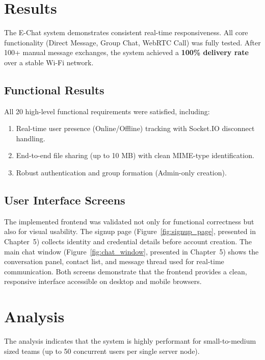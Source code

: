 \documentclass[12pt,a4paper,oneside]{report}
\begin{document}
\section{Results}
\label{sec:results}

The E-Chat system demonstrates consistent real-time responsiveness. All core
functionality (Direct Message, Group Chat, WebRTC Call) was fully tested. After
100+ manual message exchanges, the system achieved a \textbf{100\% delivery rate}
over a stable Wi-Fi network.

\subsection{Functional Results}
\label{subsec:functional-results}

All 20 high-level functional requirements were satisfied, including:
\begin{enumerate}
    \item Real-time user presence (Online/Offline) tracking with Socket.IO disconnect handling.
    \item End-to-end file sharing (up to 10 MB) with clean MIME-type identification.
    \item Robust authentication and group formation (Admin-only creation).
\end{enumerate}

\subsection{User Interface Screens}
\label{subsec:ui-screens}

The implemented frontend was validated not only for functional correctness but also
for visual usability. The signup page (Figure~\ref{fig:signup_page}, presented in
Chapter~5) collects identity and credential details before account creation.
The main chat window (Figure~\ref{fig:chat_window}, presented in Chapter~5)
shows the conversation panel, contact list, and message thread used for
real-time communication. Both screens demonstrate that the frontend provides a
clean, responsive interface accessible on desktop and mobile browsers.

\section{Analysis}
\label{sec:analysis}

The analysis indicates that the system is highly performant for small-to-medium
sized teams (up to 50 concurrent users per single server node).
\end{document}
